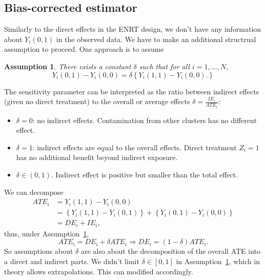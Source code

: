 \documentclass{article}[12pt]
\newtheorem{assumption}{Assumption}
\theoremstyle{definition}
\begin{document}
\subsection*{Bias-corrected estimator}
Similarly to the direct effects in the ENRT design,
we don't have any information about $Y_i(0,1)$ in the observed data.
We have to make an additional structrual assumption to proceed. 
One approach is to assume 
\begin{assumption}
    \label{ass:po_prop}
    There exists a constant $\delta$ such that for all $i=1,\ldots,N$,
    \begin{equation*}
        Y_i(0,1) - Y_i(0,0) = 
    \delta\left\{
        Y_i(1,1) - Y_i(0,0).
    \right\}
    \end{equation*} 
\end{assumption}
The sensitivity parameter can be interpreted as the ratio between indirect 
effects (given no direct treatment) to the overall or average effects
$\delta = \frac{IE_i}{ATE_i}$:
\begin{itemize}
    \item $\delta=0$: no indirect effects. Contamination from other clusters 
                   has no different effect.
    \item $\delta=1$: indirect effects are equal to the overall effects.
             Direct treatment $Z_i=1$ has no additional benefit beyond indirect exposure.
   \item $\delta \in (0,1)$. Indirect effect is positive but smaller than the total effect.
\end{itemize}
We can decompose 
\begin{equation*}
   \begin{aligned}
    ATE_i &= Y_i(1,1) - Y_i(0,0) 
    \\ &= \left\{Y_i(1,1) - Y_i(0,1) \right\} + \left\{Y_i(0,1) - Y_i(0,0) \right\}
    \\ &= DE_i + IE_i,
   \end{aligned}
\end{equation*}
thus, under Assumption~\ref{ass:po_prop}, 
\begin{equation*}
        ATE_i = DE_i + \delta ATE_i \Rightarrow DE_i = (1-\delta) ATE_i.
\end{equation*}
So assumptions about $\delta$ are also about the decomposition of 
the overall ATE into a direct and indirect parts. 
We didn't limit $\delta \in [0,1]$ in Assumption~\ref{ass:po_prop},
which in theory allows extrapolations. This can modified accordingly.
\end{document}
